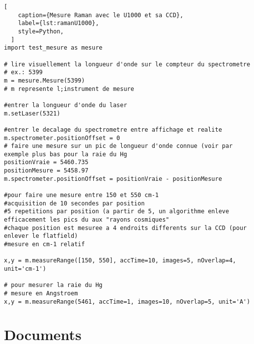 \documentclass[11pt,francais]{book} %
\begin{document}
\begin{lstlisting}[
    caption={Mesure Raman avec le U1000 et sa CCD},
    label={lst:ramanU1000},
    style=Python,
  ]  
import test_mesure as mesure

# lire visuellement la longueur d'onde sur le compteur du spectrometre
# ex.: 5399
m = mesure.Mesure(5399)
# m represente l;instrument de mesure

#entrer la longueur d'onde du laser
m.setLaser(5321)

#entrer le decalage du spectrometre entre affichage et realite
m.spectrometer.positionOffset = 0
# faire une mesure sur un pic de longueur d'onde connue (voir par exemple plus bas pour la raie du Hg
positionVraie = 5460.735
positionMesure = 5458.97
m.spectrometer.positionOffset = positionVraie - positionMesure

#pour faire une mesure entre 150 et 550 cm-1
#acquisition de 10 secondes par position
#5 repetitions par position (a partir de 5, un algorithme enleve efficacement les pics du aux "rayons cosmiques"
#chaque position est mesuree a 4 endroits differents sur la CCD (pour enlever le flatfield)
#mesure en cm-1 relatif

x,y = m.measureRange([150, 550], accTime=10, images=5, nOverlap=4, unit='cm-1')

# pour mesurer la raie du Hg
# mesure en Angstroem
x,y = m.measureRange(5461, accTime=1, images=10, nOverlap=5, unit='A')
\end{lstlisting}



 
\chapter{Documents}
\label{chap:documents}










\cleardoublepage
{}
\setlength{\columnsep}{0.75cm}
\printindex

\end{document}
